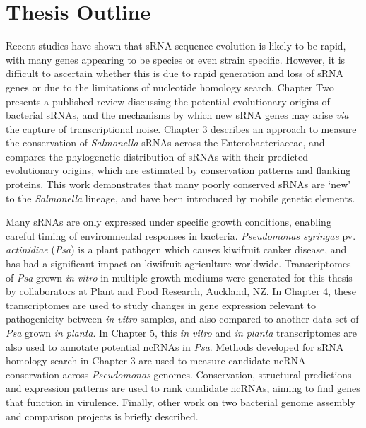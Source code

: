 \section{Thesis Outline}

Recent studies have shown that sRNA sequence evolution is likely to be rapid, with many genes appearing to be species or even strain specific. However, it is difficult to ascertain whether this is due to rapid generation and loss of sRNA genes or due to the limitations of nucleotide homology search. Chapter Two presents a published review discussing the potential evolutionary origins of bacterial sRNAs, and the mechanisms by which new sRNA genes may arise \textit{via} the capture of transcriptional noise. Chapter 3 describes an approach to measure the conservation of \textit{Salmonella} sRNAs across the Enterobacteriaceae, and compares the phylogenetic distribution of sRNAs with their predicted evolutionary origins, which are estimated by conservation patterns and flanking proteins. This work demonstrates that many poorly conserved sRNAs are ‘new’ to the \textit{Salmonella} lineage, and have been introduced by mobile genetic elements. \par

Many sRNAs are only expressed under specific growth conditions, enabling careful timing of environmental responses in bacteria. \textit{Pseudomonas syringae} pv. \textit{actinidiae} (\textit{Psa}) is a plant pathogen which causes kiwifruit canker disease, and has had a significant impact on kiwifruit agriculture worldwide. Transcriptomes of \textit{Psa} grown \textit{in vitro} in multiple growth mediums were generated for this thesis by collaborators at Plant and Food Research, Auckland, NZ. In Chapter 4, these transcriptomes are used to study changes in gene expression relevant to pathogenicity between \textit{in vitro} samples, and also compared to another data-set of \textit{Psa} grown \textit{in planta}. In Chapter 5, this \textit{in vitro} and \textit{in planta} transcriptomes are also used to annotate potential ncRNAs in \textit{Psa}. Methods developed for sRNA homology search in Chapter 3 are used to measure candidate ncRNA conservation across \textit{Pseudomonas} genomes. Conservation, structural predictions and expression patterns are used to rank candidate ncRNAs, aiming to find genes that function in virulence. Finally, other work on two bacterial genome assembly and comparison projects is briefly described.





